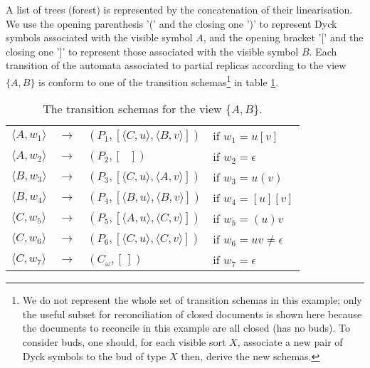 A list of trees (forest) is represented by the concatenation of their linearisation. We use the opening parenthesis '(' and the closing one ')' to represent Dyck symbols associated with the visible symbol $A$, and the opening bracket '[' and the closing one ']' to represent those associated with the visible symbol $B$. Each transition of the automata associated to partial replicas according to the view $\{A, B\}$ is conform to one of the transition schemas\footnote{We do not represent the whole set of transition schemas in this example; only the useful subset for reconciliation of closed documents is shown here because the documents to reconcile in this example are all closed (has no buds). To consider buds, one should, for each visible sort $X$, associate a new pair of Dyck symbols to the bud of type $X$ then, derive the new schemas.} in table \ref{chap2:table:trans-schem-a-b}.
\begin{table}[ht]
	\centering
	\caption{The transition schemas for the view $\{A, B\}$.}
	\label{chap2:table:trans-schem-a-b}
	\begin{tabular}[t]{lcll}
	$\langle A,w_{1} \rangle$ & $\longrightarrow$ & $(P_{1}, [\langle C,u \rangle, \langle B,v \rangle])$ & if $w_{1}=u[v]$ \\
	
	$\langle A,w_{2} \rangle$ & $\longrightarrow$ & $(P_{2}, [\textit{ }])$ & if $w_{2}=\epsilon$\\
	
	$\langle B,w_{3} \rangle$ & $\longrightarrow$ & $(P_{3}, [\langle C,u \rangle, \langle A,v \rangle])$ & if $w_{3}=u(v)$\\
	
	$\langle B,w_{4} \rangle$ & $\longrightarrow$ & $(P_{4}, [\langle B,u \rangle, \langle B,v \rangle])$ & if $w_{4}=[u][v]$\\
	
	$\langle C,w_{5} \rangle$ & $\longrightarrow$ & $(P_{5}, [\langle A,u \rangle, \langle C,v \rangle])$ & if $w_{5}=(u)v$\\
	
	$\langle C,w_{6} \rangle$ & $\longrightarrow$ & $(P_{6}, [\langle C,u \rangle, \langle C,v \rangle])$ & if $w_{6}=uv\neq\epsilon$\\
	
	$\langle C,w_{7} \rangle$ & $\longrightarrow$ & $(C_\omega,[\,])$ & if $w_{7}=\epsilon$ \\
	\end{tabular}
\end{table}
